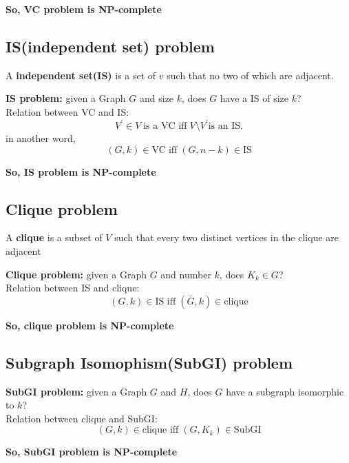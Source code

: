 \documentclass{article}
\begin{document}
\textbf{So, VC problem is NP-complete}

\subsection{IS(independent set) problem} 
\begin{definition}
A \textbf{independent set(IS)} is a set of $v$ such that no two of which are adjacent.
\end{definition}
\textbf{IS problem:} given a Graph $G$ and size $k$, does $G$ have a IS of size $k$?\\

Relation between VC and IS: 
\[
V^{'} \in V \; \text{is a VC iff} \; V\setminus V^{'} \text{is an IS.}
\]
in another word,
\[
(G, k) \in \text{VC} \; \text{iff} \; (G, n-k) \in \text{IS}
\]

\textbf{So, IS problem is NP-complete}

\subsection{Clique problem} 
\begin{definition}
A \textbf{clique} is a subset of $V$ such that every two distinct vertices in the clique are adjacent
\end{definition}
\textbf{Clique problem:} given a Graph $G$ and number $k$, does $K_{k} \in G$?\\

Relation between IS and clique:
\[
(G, k) \in \text{IS iff} \; (\bar G, k) \in \text{clique}
\]

\textbf{So, clique problem is NP-complete}

\subsection{Subgraph Isomophism(SubGI) problem} 
\textbf{SubGI problem:} given a Graph $G$ and $H$, does $G$ have a subgraph isomorphic to $k$?\\

Relation between clique and SubGI:
\[
(G, k) \in \text{clique iff} \; (G, K_{k}) \in \text{SubGI}
\]

\textbf{So, SubGI problem is NP-complete}
\end{document}
